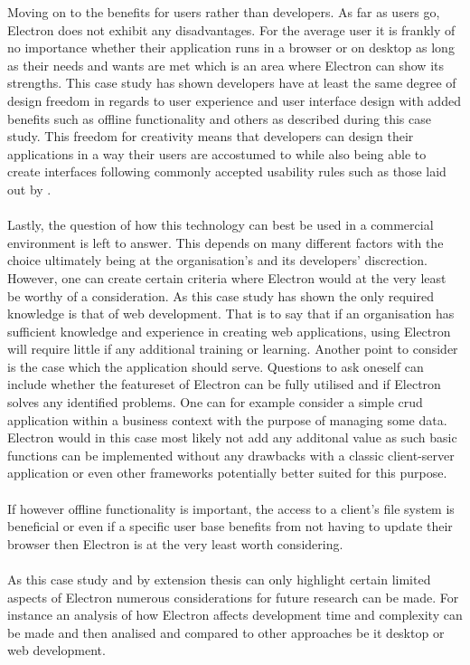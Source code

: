 Moving on to the benefits for users rather than developers.
As far as users go, Electron does not exhibit any disadvantages. 
For the average user it is frankly of no importance whether their application
runs in a browser or on desktop as long as their needs and wants are met which
is an area where Electron can show its strengths. 
This case study has shown developers have at least the same degree of 
design freedom in regards to user experience and user interface design 
with added benefits such as offline functionality and others as described
during this case study. 
This freedom for creativity means that developers can design their applications
in a way their users are accostumed to while also being able to create
interfaces following commonly accepted usability rules such as those
laid out by \textcite{usabilityHeuristics}.\paragraph{}
Lastly, the question of how this technology can best be used in 
a commercial environment is left to answer.
This depends on many different factors with the choice 
ultimately being at the organisation's and its 
developers' discrection. 
However, one can create certain criteria where Electron would at the 
very least be worthy of a consideration. 
As this case study has shown the only required knowledge is that 
of web development. 
That is to say that if an organisation has sufficient knowledge and 
experience in creating web applications, using Electron will require 
little if any additional training or learning. 
Another point to consider is the case which the application should serve.
Questions to ask oneself can include whether the featureset of Electron 
can be fully utilised and if Electron solves any identified problems. 
One can for example consider a simple \acrfull{crud} application within 
a business context with the purpose of managing some data. 
Electron would in this case most likely not add any additonal value 
as such basic functions can be implemented without any drawbacks with 
a classic client-server application or even other frameworks potentially better
suited for this purpose.\paragraph{}
If however offline functionality is important, the access to a client's file 
system is beneficial or even if a specific user base benefits from not having
to update their browser then Electron is at the very least worth considering.\paragraph{}
As this case study and by extension thesis can only highlight certain limited 
aspects of Electron numerous considerations for future research can be made. 
For instance an analysis of how Electron affects development time and complexity 
can be made and then analised and compared to other approaches be it desktop
or web development.\paragraph{}

